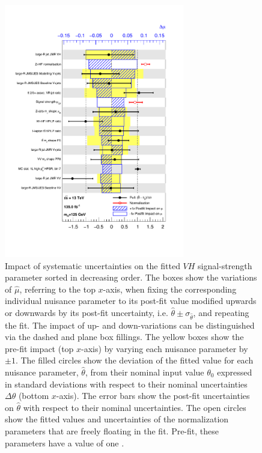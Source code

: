 \begin{figure}[!htbp]
  \centering
  \includegraphics[width=0.7\textwidth]{chapters/6.vhbb_boosted/figs/Ranking_VH_Observed.pdf}
  \caption{
    Impact of systematic uncertainties on the fitted $VH$ signal-strength parameter \muVH sorted in decreasing order.
    The boxes show the variations of $\hat{\mu}$, referring to the top $x$-axis, when fixing the corresponding individual nuisance parameter to its post-fit value modified upwards or downwards by its post-fit uncertainty, i.e. $\hat{\theta} \pm \sigma_{\hat{\theta}}$, and repeating the fit.
    The impact of up- and down-variations can be distinguished via the dashed and plane box fillings.
    The yellow boxes show the pre-fit impact (top $x$-axis) by varying each nuisance parameter by $\pm 1$. The filled circles show the deviation of the fitted value for each nuisance parameter, $\hat{\theta}$, from their nominal input value $\theta_0$ expressed in standard deviations with respect to their nominal uncertainties $\Delta \theta$ (bottom $x$-axis).
    The error bars show the post-fit uncertainties on $\hat{\theta}$ with respect to their nominal uncertainties.
    The open circles show the fitted values and uncertainties of the normalization parameters that are freely floating in the fit.
    Pre-fit, these parameters have a value of one \cite{Dao:2688371}.
  }
  \label{fig:np_ranking}
\end{figure}


